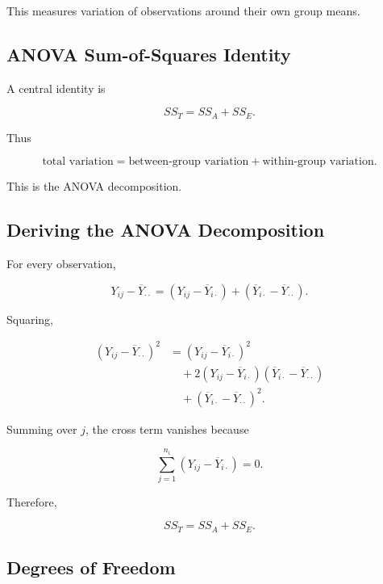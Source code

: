 This measures variation of observations around their own group means.

\subsection{ANOVA Sum-of-Squares Identity}
\label{subsec:anova-sum-squares-identity}

A central identity is

\[
\boxed{
SS_T
=
SS_A
+
SS_E.
}
\]

Thus

\[
\boxed{
\text{total variation}
=
\text{between-group variation}
+
\text{within-group variation}.
}
\]

This is the ANOVA decomposition.

\subsection{Deriving the ANOVA Decomposition}
\label{subsec:derive-anova-decomposition}

For every observation,

\[
Y_{ij}
-
\overline{Y}_{\cdot\cdot}
=
\left(
Y_{ij}
-
\overline{Y}_{i\cdot}
\right)
+
\left(
\overline{Y}_{i\cdot}
-
\overline{Y}_{\cdot\cdot}
\right).
\]

Squaring,

\[
\begin{aligned}
\left(
Y_{ij}
-
\overline{Y}_{\cdot\cdot}
\right)^2
&=
\left(
Y_{ij}
-
\overline{Y}_{i\cdot}
\right)^2
\\
&\quad+
2
\left(
Y_{ij}
-
\overline{Y}_{i\cdot}
\right)
\left(
\overline{Y}_{i\cdot}
-
\overline{Y}_{\cdot\cdot}
\right)
\\
&\quad+
\left(
\overline{Y}_{i\cdot}
-
\overline{Y}_{\cdot\cdot}
\right)^2.
\end{aligned}
\]

Summing over \(j\), the cross term vanishes because

\[
\sum_{j=1}^{n_i}
\left(
Y_{ij}
-
\overline{Y}_{i\cdot}
\right)
=
0.
\]

Therefore,

\[
\boxed{
SS_T
=
SS_A+SS_E.
}
\]

\subsection{Degrees of Freedom}
\label{subsec:anova-degrees-freedom}

